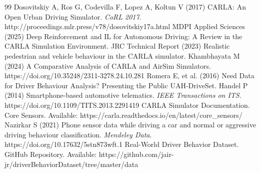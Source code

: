 \documentclass[pdflatex,sn-mathphys-num]{sn-jnl}
\theoremstyle{thmstyleone}
\theoremstyle{thmstyletwo}
\theoremstyle{thmstylethree}
\begin{document}
\begin{thebibliography}{99}
 Dosovitskiy A, Ros G, Codevilla F, Lopez A, Koltun V (2017) CARLA: An Open Urban Driving Simulator. \textit{CoRL 2017}. http://proceedings.mlr.press/v78/dosovitskiy17a.html
 MDPI Applied Sciences (2025) Deep Reinforcement and IL for Autonomous Driving: A Review in the CARLA Simulation Environment.
 JRC Technical Report (2023) Realistic pedestrian and vehicle behaviour in the CARLA simulator.
 Khambhayata M (2024) A Comparative Analysis of CARLA and AirSim Simulators. https://doi.org/10.35248/2311-3278.24.10.281
 Romera E, et al. (2016) Need Data for Driver Behaviour Analysis? Presenting the Public UAH-DriveSet.
 Handel P (2014) Smartphone-based automotive telematics. \textit{IEEE Transactions on ITS}. https://doi.org/10.1109/TITS.2013.2291419
 CARLA Simulator Documentation. Core Sensors. Available: https://carla.readthedocs.io/en/latest/core\_sensors/
 Nazirkar S (2021) Phone sensor data while driving a car and normal or aggressive driving behaviour classification. \textit{Mendeley Data}. https://doi.org/10.17632/5stn873wft.1
 Real-World Driver Behavior Dataset. GitHub Repository. Available: https://github.com/jair-jr/driverBehaviorDataset/tree/master/data

\end{thebibliography}
\end{document}
